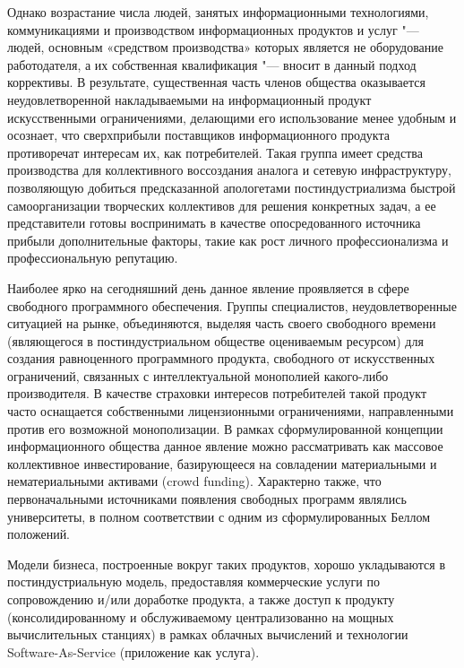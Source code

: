 \documentclass[10pt, a5paper]{article}
\begin{document}
Однако возрастание числа людей, занятых информационными технологиями, коммуникациями и производством информационных продуктов и услуг "--- людей, основным «средством производства» которых является не оборудование работодателя, а их собственная квалификация \cite{ivanova2} "--- вносит в данный подход коррективы. В результате, существенная часть членов общества оказывается неудовлетворенной накладываемыми на информационный продукт искусственными ограничениями, делающими его использование менее удобным и осознает, что сверхприбыли поставщиков информационного продукта противоречат интересам их, как потребителей. Такая группа имеет средства производства для коллективного воссоздания аналога и сетевую инфраструктуру, позволяющую добиться предсказанной апологетами постиндустриализма быстрой самоорганизации творческих коллективов для решения конкретных задач, а ее представители готовы воспринимать в качестве опосредованного источника прибыли дополнительные факторы, такие как рост личного профессионализма и профессиональную репутацию.

Наиболее ярко на сегодняшний день данное явление проявляется в сфере свободного программного обеспечения. Группы специалистов, неудовлетворенные ситуацией на рынке, объединяются, выделяя часть своего свободного времени (являющегося в постиндустриальном обществе оцениваемым ресурсом) для создания равноценного программного продукта, свободного от искусственных ограничений, связанных с интеллектуальной монополией \cite{ivanova3} какого-либо производителя. В качестве страховки интересов потребителей такой продукт часто оснащается собственными лицензионными ограничениями, направленными против его возможной монополизации.
В рамках сформулированной концепции информационного общества данное явление можно рассматривать как массовое коллективное инвестирование, базирующееся на совладении материальными и нематериальными активами (crowd funding). Характерно также, что первоначальными источниками появления свободных программ являлись университеты, в полном соответствии с одним из сформулированных Беллом положений.

Модели бизнеса, построенные вокруг таких продуктов, хорошо укладываются в постиндустриальную модель, предоставляя коммерческие услуги по сопровождению и/или доработке продукта, а также доступ к продукту (консолидированному и обслуживаемому централизованно на мощных вычислительных станциях) в рамках облачных вычислений и технологии Software-As-Service (приложение как услуга).
\end{document}
